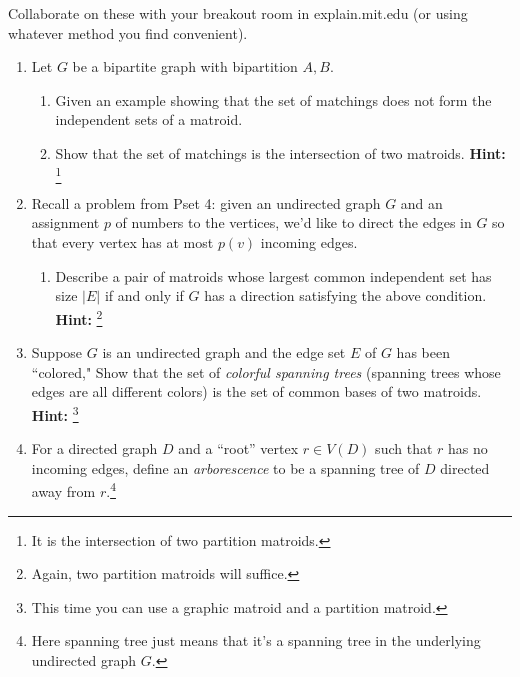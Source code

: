 \documentclass[12pt]{article} 
\begin{document}

\medskip
Collaborate on these with your breakout room in explain.mit.edu (or using whatever method you find convenient).

\begin{enumerate}
\item Let $G$ be a bipartite graph with bipartition $A, B$.
\begin{enumerate}
\item Given an example showing that the set of matchings does not form the independent sets of a matroid.
\item Show that the set of matchings is the intersection of two matroids. \textbf{ Hint: }\footnote{It is the intersection of two partition matroids. }
\end{enumerate}
\newpage

\item Recall a problem from Pset 4: given an undirected graph $G$ and an assignment $p$ of numbers to the vertices, we'd like to direct the edges in $G$ so that every vertex has at most $p(v)$ incoming edges. 
\begin{enumerate}
\item Describe a pair of matroids whose largest common independent set has size $|E|$ if and only if $G$ has a direction satisfying the above condition. \textbf{Hint: }\footnote{Again, two partition matroids will suffice.}
\end{enumerate}
\newpage

\item Suppose $G$ is an undirected graph and the edge set $E$ of $G$ has been ``colored,"
 Show that the set of \emph{colorful spanning trees} (spanning trees whose edges are all different colors) is the set of common bases of two matroids. \textbf{ Hint: }\footnote{This time you can use a graphic matroid and a partition matroid.}
\newpage

\item For a directed graph $D$ and a ``root'' vertex $r \in V(D)$ such that $r$ has no incoming edges, define an \emph{arborescence} to be a spanning tree of $D$ directed away from $r$.\footnote{Here spanning tree just means that it's a spanning tree in the underlying undirected graph $G$.} 


\end{enumerate}
\end{document}
